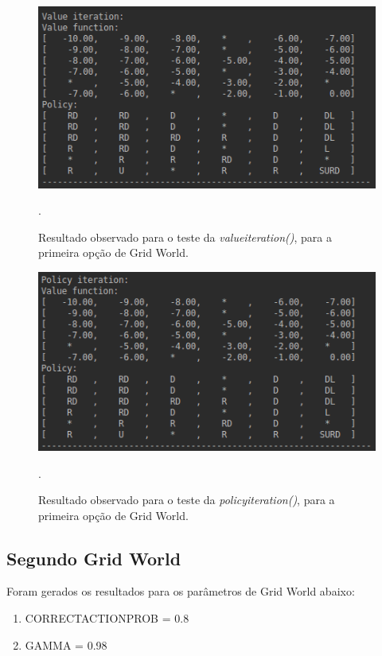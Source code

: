 \documentclass[conference]{IEEEtran}
\begin{document}
\begin{figure}[htbp]
\centering
\centerline{\includegraphics[scale=0.5]{imagens/grid1/value_iteration.png}}
\caption{Resultado observado para o teste da \textit{value\underline{\space}iteration()}, para a primeira opção de Grid World.}.
\label{grid1/value_iteration}
\end{figure} 

\begin{figure}[htbp]
\centering
\centerline{\includegraphics[scale=0.5]{imagens/grid1/policy_iteration.png}}
\caption{Resultado observado para o teste da \textit{policy\underline{\space}iteration()}, para a primeira opção de Grid World.}.
\label{grid1/policy_iteration}
\end{figure}

\subsection{Segundo Grid World}
Foram gerados os resultados para os parâmetros de Grid World abaixo:

\begin{enumerate}
\item CORRECT\underline{\space}ACTION\underline{\space}PROB = 0.8

\item GAMMA = 0.98
\end{enumerate}
\end{document}
